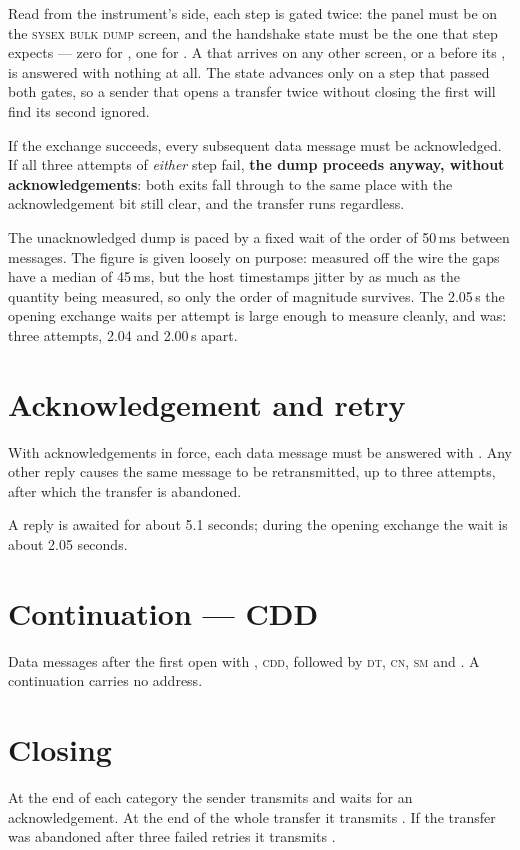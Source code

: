 Read from the instrument's side, each step is gated twice: the panel must be on the
\textsc{sysex bulk dump} screen, and the handshake state must be the one that step
expects --- zero for , one for . A  that arrives on any
other screen, or a  before its , is answered with nothing at all.
The state advances only on a step that passed both gates, so a sender that opens a
transfer twice without closing the first will find its second  ignored.

If the exchange succeeds, every subsequent data message must be acknowledged. If all three
attempts of \emph{either} step fail, \textbf{the dump proceeds anyway, without
acknowledgements}: both exits fall through to the same place with the acknowledgement bit
still clear, and the transfer runs regardless.

The unacknowledged dump is paced by a fixed wait of the order of 50\,ms between messages.
The figure is given loosely on purpose: measured off the wire the gaps have a median of
45\,ms, but the host timestamps jitter by as much as the quantity being measured, so only
the order of magnitude survives. The 2.05\,s the opening exchange waits per attempt is
large enough to measure cleanly, and was: three attempts, 2.04 and 2.00\,s apart.

\section{Acknowledgement and retry}
With acknowledgements in force, each data message must be answered with
. Any other reply causes the same message to be retransmitted, up to
three attempts, after which the transfer is abandoned.

A reply is awaited for about 5.1 seconds; during the opening exchange the wait is about
2.05 seconds.

\section{Continuation --- CDD}
Data messages after the first open with , \textsc{cdd}, followed by
\textsc{dt}, \textsc{cn}, \textsc{sm} and . A continuation carries no address.

\section{Closing}
At the end of each category the sender transmits  and waits for an
acknowledgement. At the end of the whole transfer it transmits . If
the transfer was abandoned after three failed retries it transmits .

